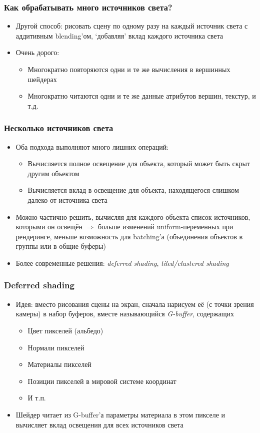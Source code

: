 \documentclass[10pt]{beamer}
\begin{document}
\begin{frame}[fragile]
\frametitle{Как обрабатывать много источников света?}
\begin{itemize}
\item Другой способ: рисовать сцену по одному разу на каждый источник света с аддитивным blending'ом, `добавляя' вклад каждого источника света
\pause
\item Очень дорого:
\begin{itemize}
\item Многократно повторяются одни и те же вычисления в вершинных шейдерах
\item Многократно читаются одни и те же данные атрибутов вершин, текстур, и т.д.
\end{itemize}
\end{itemize}
\end{frame}

\begin{frame}[fragile]
\frametitle{Несколько источников света}
\begin{itemize}
\item Оба подхода выполняют много лишних операций:
\begin{itemize}
\item Вычисляется полное освещение для объекта, который может быть скрыт другим объектом
\pause
\item Вычисляется вклад в освещение для объекта, находящегося слишком далеко от источника света
\end{itemize}
\pause
\item Можно частично решить, вычисляя для каждого объекта список источников, которыми он освещён \begin{math}\Longrightarrow\end{math} больше изменений uniform-переменных при рендеринге, меньше возможность для batching'а (объединения объектов в группы или в общие буферы)
\pause
\item Более современные решения: \textit{deferred shading}, \textit{tiled/clustered shading}
\end{itemize}
\end{frame}

\begin{frame}[fragile]
\frametitle{Deferred shading}
\begin{itemize}
\item Идея: вместо рисования сцены на экран, сначала нарисуем её (с точки зрения камеры) в набор буферов, вместе называющийся \textit{G-buffer}, содержащих
\begin{itemize}
\item Цвет пикселей (альбедо)
\item Нормали пикселей
\item Материалы пикселей
\item Позиции пикселей в мировой системе координат
\item И т.п.
\end{itemize}
\pause
\item Шейдер читает из G-buffer'а параметры материала в этом пикселе и вычисляет вклад освещения для всех источников света
\end{itemize}
\end{frame}
\end{document}
